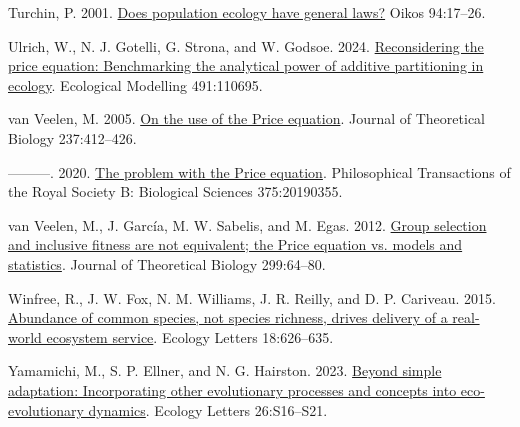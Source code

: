\documentclass[
]{article}
\newlength{\cslhangindent}
\newenvironment{CSLReferences}[2] %
 {\begin{list}{}{%
  \setlength{\itemindent}{0pt}
  \setlength{\leftmargin}{0pt}
  \setlength{\parsep}{0pt}
  \ifodd #1
   \setlength{\leftmargin}{\cslhangindent}
   \setlength{\itemindent}{-1\cslhangindent}
  \fi
  \setlength{\itemsep}{#2\baselineskip}}}
 {\end{list}}
\begin{document}
\begin{CSLReferences}{0}{0}
Turchin, P. 2001.
\href{https://doi.org/10.1034/j.1600-0706.2001.11310.x}{Does population
ecology have general laws?} Oikos 94:17--26.

Ulrich, W., N. J. Gotelli, G. Strona, and W. Godsoe. 2024.
\href{https://doi.org/10.1016/j.ecolmodel.2024.110695}{Reconsidering the
price equation: Benchmarking the analytical power of additive
partitioning in ecology}. Ecological Modelling 491:110695.

van Veelen, M. 2005.
\href{https://doi.org/10.1016/j.jtbi.2005.04.026}{{On the use of the
Price equation}}. Journal of Theoretical Biology 237:412--426.

---------. 2020. \href{https://doi.org/10.1098/rstb.2019.0355}{{The
problem with the Price equation}}. Philosophical Transactions of the
Royal Society B: Biological Sciences 375:20190355.

van Veelen, M., J. García, M. W. Sabelis, and M. Egas. 2012.
\href{https://doi.org/10.1016/j.jtbi.2011.07.025}{{Group selection and
inclusive fitness are not equivalent; the Price equation vs. models and
statistics}}. Journal of Theoretical Biology 299:64--80.

Winfree, R., J. W. Fox, N. M. Williams, J. R. Reilly, and D. P.
Cariveau. 2015. \href{https://doi.org/10.1111/ele.12424}{{Abundance of
common species, not species richness, drives delivery of a real-world
ecosystem service}}. Ecology Letters 18:626--635.

Yamamichi, M., S. P. Ellner, and N. G. Hairston. 2023.
\href{https://doi.org/10.1111/ele.14197}{Beyond simple adaptation:
Incorporating other evolutionary processes and concepts into
eco-evolutionary dynamics}. Ecology Letters 26:S16--S21.

\end{CSLReferences}
\end{document}
